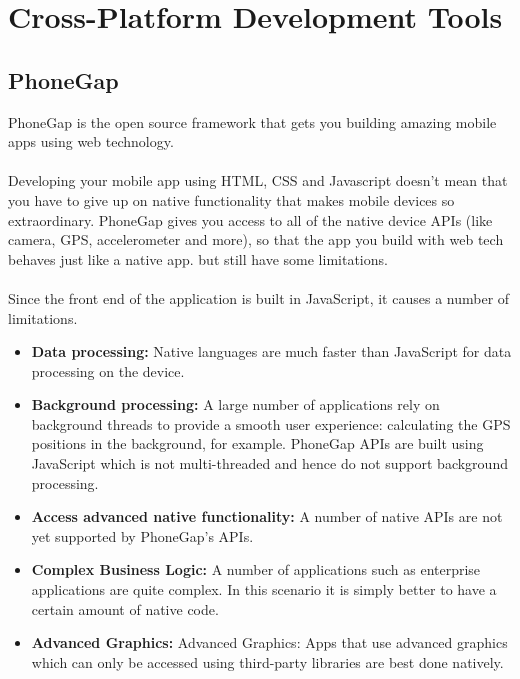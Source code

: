 \section{Cross-Platform Development Tools}


\subsection{PhoneGap}

PhoneGap is the open source framework that gets you building amazing mobile apps using web technology.

\paragraph{}
Developing your mobile app using HTML, CSS and Javascript doesn’t mean that you have to give up on native functionality that makes mobile devices so extraordinary.
PhoneGap gives you access to all of the native device APIs (like camera, GPS, accelerometer and more),
so that the app you build with web tech behaves just like a native app. but still have some limitations.

\paragraph{}
Since the front end of the application is built in JavaScript, it causes a number of limitations.

\begin{itemize}


  \item \textbf{Data processing:}  Native languages are much faster than JavaScript for data processing on the device.

  \item \textbf{Background processing:}  A large number of applications rely on background threads to provide a smooth user experience: calculating the GPS positions in the background, for example. PhoneGap APIs are built using JavaScript which is not multi-threaded and hence do not support background processing.

  \item \textbf{Access advanced native functionality:}   A number of native APIs are not yet supported by PhoneGap’s APIs.

  \item \textbf{Complex Business Logic: }  A number of applications such as enterprise applications are quite complex. In this scenario it is simply better to have a certain amount of native code.

  \item \textbf{Advanced Graphics:}  Advanced Graphics: Apps that use advanced graphics which can only be accessed using third-party libraries are best done natively.

\end{itemize}


